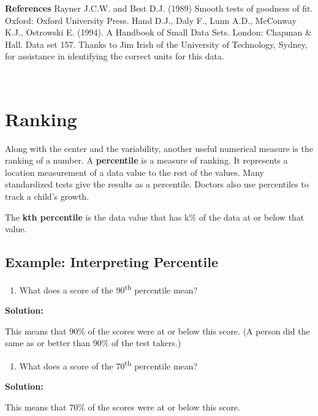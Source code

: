 \documentclass[]{book}
\providecommand{\tightlist}{%
  \setlength{\itemsep}{0pt}\setlength{\parskip}{0pt}}
\begin{document}
\textbf{References}
Rayner J.C.W. and Best D.J. (1989) Smooth tests of goodness of fit. Oxford: Oxford University Press.
Hand D.J., Daly F., Lunn A.D., McConway K.J., Ostrowski E. (1994). A Handbook of Small Data Sets. London: Chapman \& Hall. Data set 157.
Thanks to Jim Irish of the University of Technology, Sydney, for assistance in identifying the correct units for this data.

\textbf{\\
}

\hypertarget{ranking}{%
\section{Ranking}\label{ranking}}

Along with the center and the variability, another useful numerical
measure is the ranking of a number. A \textbf{percentile} is a measure of
ranking. It represents a location measurement of a data value to the
rest of the values. Many standardized tests give the results as a
percentile. Doctors also use percentiles to track a child's growth.

The \textbf{kth percentile} is the data value that has k\% of the data at or
below that value.

\hypertarget{example-interpreting-percentile}{%
\subsection{Example: Interpreting Percentile}\label{example-interpreting-percentile}}

\begin{enumerate}
\def\labelenumi{\alph{enumi}.}
\tightlist
\item
  What does a score of the 90\textsuperscript{th} percentile mean?
\end{enumerate}

\textbf{Solution:}

This means that 90\% of the scores were at or below this score. (A person did the same as or better than 90\% of the test takers.)

\begin{enumerate}
\def\labelenumi{\alph{enumi}.}
\setcounter{enumi}{1}
\tightlist
\item
  What does a score of the 70\textsuperscript{th} percentile mean?
\end{enumerate}

\textbf{Solution:}

This means that 70\% of the scores were at or below this score.
\end{document}
